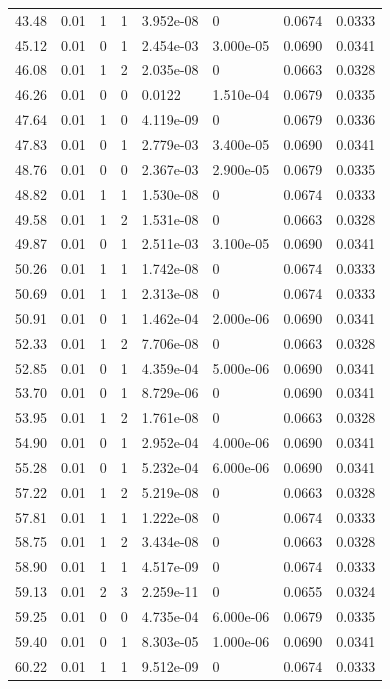 \documentclass[preview]{standalone}
\begin{document}
{{{\begin{tabular}{L{1.2cm}C{1.2cm} C{0.3cm}C{0.5cm} C{1.4cm}C{1.4cm} C{1.4cm}C{1.4cm}}
  43.48  &  0.01  & 1     &  1 &  3.952e-08  & 0  & 0.0674 &  0.0333   \\ 
  45.12  &  0.01  & 0     &  1 &  2.454e-03  & 3.000e-05  & 0.0690 &  0.0341   \\ 
  46.08  &  0.01  & 1     &  2 &  2.035e-08  & 0  & 0.0663 &  0.0328   \\ 
  46.26  &  0.01  & 0     &  0 &  0.0122  & 1.510e-04  & 0.0679 &  0.0335   \\ 
  47.64  &  0.01  & 1     &  0 &  4.119e-09  & 0  & 0.0679 &  0.0336   \\ 
  47.83  &  0.01  & 0     &  1 &  2.779e-03  & 3.400e-05  & 0.0690 &  0.0341   \\ 
  48.76  &  0.01  & 0     &  0 &  2.367e-03  & 2.900e-05  & 0.0679 &  0.0335   \\ 
  48.82  &  0.01  & 1     &  1 &  1.530e-08  & 0  & 0.0674 &  0.0333   \\ 
  49.58  &  0.01  & 1     &  2 &  1.531e-08  & 0  & 0.0663 &  0.0328   \\ 
  49.87  &  0.01  & 0     &  1 &  2.511e-03  & 3.100e-05  & 0.0690 &  0.0341   \\ 
  50.26  &  0.01  & 1     &  1 &  1.742e-08  & 0  & 0.0674 &  0.0333   \\ 
  50.69  &  0.01  & 1     &  1 &  2.313e-08  & 0  & 0.0674 &  0.0333   \\ 
  50.91  &  0.01  & 0     &  1 &  1.462e-04  & 2.000e-06  & 0.0690 &  0.0341   \\ 
  52.33  &  0.01  & 1     &  2 &  7.706e-08  & 0  & 0.0663 &  0.0328   \\ 
  52.85  &  0.01  & 0     &  1 &  4.359e-04  & 5.000e-06  & 0.0690 &  0.0341   \\ 
  53.70  &  0.01  & 0     &  1 &  8.729e-06  & 0  & 0.0690 &  0.0341   \\ 
  53.95  &  0.01  & 1     &  2 &  1.761e-08  & 0  & 0.0663 &  0.0328   \\ 
  54.90  &  0.01  & 0     &  1 &  2.952e-04  & 4.000e-06  & 0.0690 &  0.0341   \\ 
  55.28  &  0.01  & 0     &  1 &  5.232e-04  & 6.000e-06  & 0.0690 &  0.0341   \\ 
  57.22  &  0.01  & 1     &  2 &  5.219e-08  & 0  & 0.0663 &  0.0328   \\ 
  57.81  &  0.01  & 1     &  1 &  1.222e-08  & 0  & 0.0674 &  0.0333   \\ 
  58.75  &  0.01  & 1     &  2 &  3.434e-08  & 0  & 0.0663 &  0.0328   \\ 
  58.90  &  0.01  & 1     &  1 &  4.517e-09  & 0  & 0.0674 &  0.0333   \\ 
  59.13  &  0.01  & 2     &  3 &  2.259e-11  & 0  & 0.0655 &  0.0324   \\ 
  59.25  &  0.01  & 0     &  0 &  4.735e-04  & 6.000e-06  & 0.0679 &  0.0335   \\ 
  59.40  &  0.01  & 0     &  1 &  8.303e-05  & 1.000e-06  & 0.0690 &  0.0341   \\ 
  60.22  &  0.01  & 1     &  1 &  9.512e-09  & 0  & 0.0674 &  0.0333   \\ 
\hline 
\end{tabular} 

}}}
\end{document}
